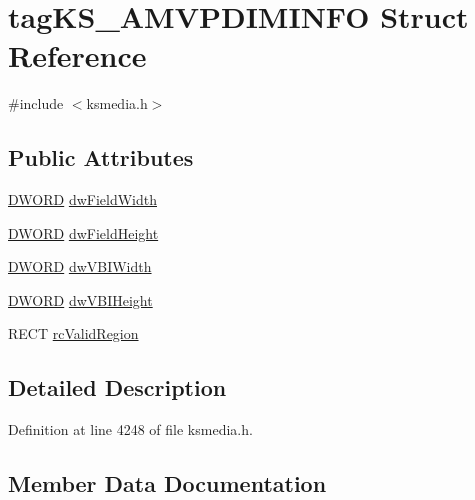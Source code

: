 \hypertarget{structtag_k_s___a_m_v_p_d_i_m_i_n_f_o}{}\section{tag\+K\+S\+\_\+\+A\+M\+V\+P\+D\+I\+M\+I\+N\+FO Struct Reference}
\label{structtag_k_s___a_m_v_p_d_i_m_i_n_f_o}


{\ttfamily \#include $<$ksmedia.\+h$>$}

\subsection*{Public Attributes}
\begin{DoxyCompactItemize}
\item 
\hyperlink{mapinls_8h_ad342ac907eb044443153a22f964bf0af}{D\+W\+O\+RD} \hyperlink{structtag_k_s___a_m_v_p_d_i_m_i_n_f_o_a910f54dd7181dc814c5b3997f0a54638}{dw\+Field\+Width}
\item 
\hyperlink{mapinls_8h_ad342ac907eb044443153a22f964bf0af}{D\+W\+O\+RD} \hyperlink{structtag_k_s___a_m_v_p_d_i_m_i_n_f_o_a2104027af76390e459d62491dbe0f127}{dw\+Field\+Height}
\item 
\hyperlink{mapinls_8h_ad342ac907eb044443153a22f964bf0af}{D\+W\+O\+RD} \hyperlink{structtag_k_s___a_m_v_p_d_i_m_i_n_f_o_ab966b321ddc728f2c1a64408d10ac353}{dw\+V\+B\+I\+Width}
\item 
\hyperlink{mapinls_8h_ad342ac907eb044443153a22f964bf0af}{D\+W\+O\+RD} \hyperlink{structtag_k_s___a_m_v_p_d_i_m_i_n_f_o_adc94f959d0f2cc0346932fd4fe54d668}{dw\+V\+B\+I\+Height}
\item 
R\+E\+CT \hyperlink{structtag_k_s___a_m_v_p_d_i_m_i_n_f_o_a91668fe2a2ab25c0ed8d7c054fb631eb}{rc\+Valid\+Region}
\end{DoxyCompactItemize}


\subsection{Detailed Description}


Definition at line 4248 of file ksmedia.\+h.



\subsection{Member Data Documentation}
